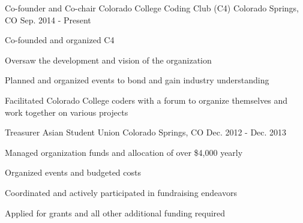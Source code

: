 


\begin{cventries}


\vspace{-.25em}
\cventry
{Co-founder and Co-chair} %
{Colorado College Coding Club (C4)} %
{Colorado Springs, CO} %
{Sep. 2014 - Present} %
{ %
\begin{cvitems}
\item {Co-founded and organized C4}
\item {Oversaw the development and vision of the organization}
\item {Planned and organized events to bond and gain industry understanding}
\item {Facilitated Colorado College coders with a forum to organize themselves and work together on various projects}
\end{cvitems}
}


\vspace{-1.25em}
\cventry
{Treasurer} %
{Asian Student Union} %
{Colorado Springs, CO} %
{Dec. 2012 - Dec. 2013} %
{ %
\begin{cvitems}
\item {Managed organization funds and allocation of over \$4,000 yearly}
\item {Organized events and budgeted costs}
\item {Coordinated and actively participated in fundraising endeavors}
\item {Applied for grants and all other additional funding required}
\end{cvitems}
}



\end{cventries}
